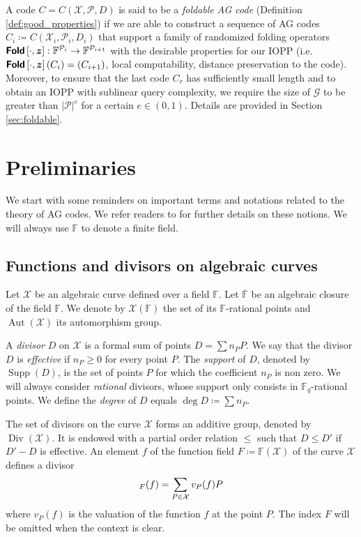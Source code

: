 \documentclass[10pt,a4paper]{article}
\newcommand\F{\mathbb{F}}
\newcommand\Fq{\mathbb{F}_q}
\newcommand\fold[1]{\textsf{\textbf{Fold}}\left[#1\right]}
\renewcommand{\bar}{\overline}
\DeclareMathOperator{\Supp}{Supp}
\DeclareMathOperator{\Aut}{Aut}
\DeclareMathOperator{\Div}{Div}
\let\div\relax\DeclareMathOperator{\div}{div}
\renewcommand{\vec}[1]{\boldsymbol{#1}}
\newcommand{\size}[1]{\left|#1\right|}
\newcommand\bfz{{\vec{z}}}
\newcommand\calX{\mathcal{X}}
\newcommand\calP{\mathcal{P}}
\newcommand\calG{\mathcal{G}}
\newcommand\mydef{\coloneqq}
\theoremstyle{plain}
\theoremstyle{plain}
\theoremstyle{definition}
\theoremstyle{remark}
\theoremstyle{plain}
\begin{document}
A code $C = C(\calX, \calP, D)$ is said to be a \emph{foldable AG code} (Definition \ref{def:good_properties}) if we are able to construct a sequence of AG codes $C_i\mydef C(\calX_i,\calP_i,D_i)$ that support a family of randomized folding operators $\fold{\cdot, \bfz} : \F^{\calP_i} \rightarrow \F^{\calP_{i+1}}$ with the desirable properties for our IOPP (i.e. $\fold{\cdot, \bfz}(C_i) = (C_{i+1})$, local computability, distance preservation to the code). Moreover, to ensure that the last code $C_r$ has sufficiently small length and to obtain an IOPP with sublinear query complexity, we require the size of $\calG$ to be greater than $\size{\calP}^{e}$ for a certain $e \in (0,1)$. Details are provided in Section \ref{sec:foldable}.

\section{Preliminaries}\label{sec:preli}

We start with some reminders on important terms and notations related to the theory of AG codes. We refer readers to \cite{TNV07,S08} for further details on these notions. We will always use $\F$ to denote a finite field.

\subsection{Functions and divisors on algebraic curves}
Let $\calX$ be an algebraic curve defined over a field $\F$. Let $\bar{\F}$ be an algebraic closure of the field $\F$. We denote by $\calX(\F)$ the set of its $\F$-rational points and $\Aut(\calX)$ its automorphism group. 


A \emph{divisor} $D$ on $\calX$ is a formal sum of points $D=\sum n_P P$. We say that the divisor $D$ is \emph{effective} if $n_P \geq 0$ for every point $P$. The \emph{support} of $D$, denoted by $\Supp(D)$, is the set of points $P$ for which the coefficient $n_P$ is non zero. We will always consider \textit{rational} divisors, whose support only consists in $\Fq$-rational points. We define the \emph{degree} of $D$ equals $\deg D \mydef \sum n_P$.

The set of divisors on the curve $\calX$ forms an additive group, denoted by $\Div(\calX)$. It is endowed with a partial order relation $\leq$ such that $D \leq D'$ if $D'-D$ is effective. An element $f$ of the function field $F\mydef \F(\calX)$ of the curve $\calX$ defines a divisor 
\[\div_{F}(f) = \sum_{P\in \calX} v_P(f) P\]
where $v_P(f)$ is the valuation of the function $f$ at the point $P$. The index $F$ will be omitted when the context is clear.
\end{document}
